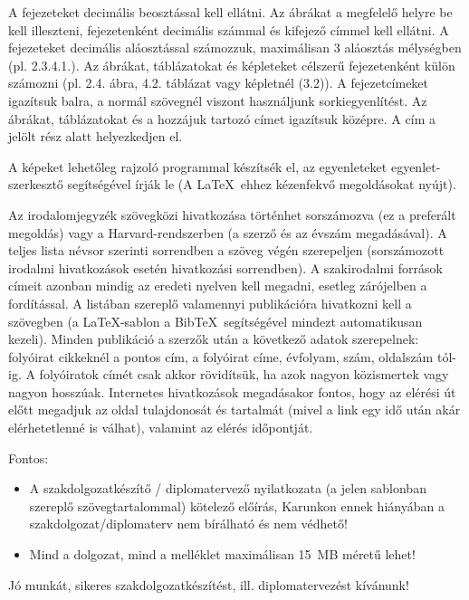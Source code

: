A fejezeteket decimális beosztással kell ellátni. Az ábrákat a megfelelő helyre be kell illeszteni, fejezetenként decimális számmal és kifejező címmel kell ellátni. A fejezeteket decimális aláosztással számozzuk, maximálisan 3 aláosztás mélységben (pl. 2.3.4.1.). Az ábrákat, táblázatokat és képleteket célszerű fejezetenként külön számozni (pl. 2.4. ábra, 4.2. táblázat vagy képletnél (3.2)). A fejezetcímeket igazítsuk balra, a normál szövegnél viszont használjunk sorkiegyenlítést. Az ábrákat, táblázatokat és a hozzájuk tartozó címet igazítsuk középre. A cím a jelölt rész alatt helyezkedjen el.

A képeket lehetőleg rajzoló programmal készítsék el, az egyenleteket egyenlet-szerkesztő segítségével írják le (A \LaTeX~ehhez kézenfekvő megoldásokat nyújt).

Az irodalomjegyzék szövegközi hivatkozása történhet sorszámozva (ez a preferált megoldás) vagy a Harvard-rendszerben (a szerző és az évszám megadásával). A teljes lista névsor szerinti sorrendben a szöveg végén szerepeljen (sorszámozott irodalmi hivatkozások esetén hivatkozási sorrendben). A szakirodalmi források címeit azonban mindig az eredeti nyelven kell megadni, esetleg zárójelben a fordítással. A listában szereplő valamennyi publikációra hivatkozni kell a szövegben (a \LaTeX-sablon a Bib\TeX~segítségével mindezt automatikusan kezeli). Minden publikáció a szerzők után a következő adatok szerepelnek: folyóirat cikkeknél a pontos cím, a folyóirat címe, évfolyam, szám, oldalszám tól-ig. A folyóiratok címét csak akkor rövidítsük, ha azok nagyon közismertek vagy nagyon hosszúak. Internetes hivatkozások megadásakor fontos, hogy az elérési út előtt megadjuk az oldal tulajdonosát és tartalmát (mivel a link egy idő után akár elérhetetlenné is válhat), valamint az elérés időpontját.

\vspace{5mm}
Fontos:
\begin{itemize}
	\item A szakdolgozatkészítő / diplomatervező nyilatkozata (a jelen sablonban szereplő szövegtartalommal) kötelező előírás, Karunkon ennek hiányában a szakdolgozat/diplomaterv nem bírálható és nem védhető!
	\item Mind a dolgozat, mind a melléklet maximálisan 15~MB méretű lehet!
\end{itemize}

\vspace{5mm}
\begin{center}
Jó munkát, sikeres szakdolgozatkészítést, ill. diplomatervezést kívánunk!
\end{center}

\normalsize
\selectthesislanguage{}
